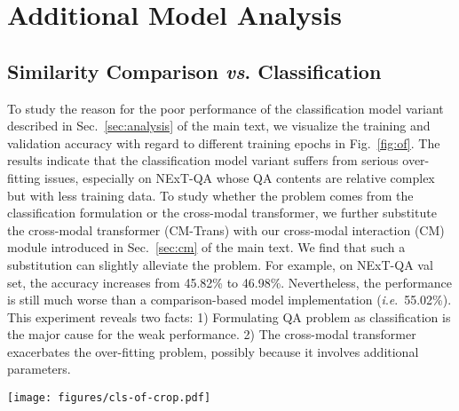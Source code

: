 \documentclass[runningheads]{llncs}
\newcommand{\ie}{\textit{i}.\textit{e}.}
\newcommand{\vs}{\textit{vs}. }
\begin{document}
\section{Additional Model Analysis}
\label{app:addexp}
\subsection{Similarity Comparison \vs Classification} 
\label{app:cls}
To study the reason for the poor performance of the classification model variant described in Sec.~\ref{sec:analysis} of the main text, we visualize the training and validation accuracy with regard to different training epochs in Fig.~\ref{fig:of}. The results indicate that the classification model variant suffers from serious over-fitting issues, especially on NExT-QA \cite{xiao2021next} whose QA contents are relative complex but with less training data. To study whether the problem comes from the classification formulation or the cross-modal transformer, we further substitute the cross-modal transformer (CM-Trans) with our cross-modal interaction (CM) module introduced in Sec.~\ref{sec:cm} of the main text. We find that such a substitution can slightly alleviate the problem. For example, on NExT-QA val set, the accuracy increases from 45.82\% to 46.98\%. Nevertheless, the performance is still much worse than a comparison-based model implementation (\ie~55.02\%). This experiment reveals two facts: 1) Formulating QA problem as classification is the major cause for the weak performance. 2) The cross-modal transformer exacerbates the over-fitting problem, possibly because it involves additional parameters.

\begin{figure*}[t!]
  \begin{center}
    \texttt{[image: figures/cls-of-crop.pdf]}
  \end{center}
  \vspace{-0.4cm}
  \caption{Accuracy with regard to different training epochs.}
  \label{fig:of}
\end{figure*}
\end{document}
